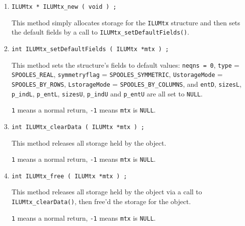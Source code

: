 \begin{enumerate}
\item
\begin{verbatim}
ILUMtx * ILUMtx_new ( void ) ;
\end{verbatim}
This method simply allocates storage for the {\tt ILUMtx} structure 
and then sets the default fields by a call to 
{\tt ILUMtx\_setDefaultFields()}.
\item
\begin{verbatim}
int ILUMtx_setDefaultFields ( ILUMtx *mtx ) ;
\end{verbatim}
This method sets the structure's fields to default values:
{\tt neqns = 0},
{\tt type} = {\tt SPOOLES\_REAL}, 
{\tt symmetryflag} = {\tt SPOOLES\_SYMMETRIC}, 
{\tt UstorageMode} = {\tt SPOOLES\_BY\_ROWS}, 
{\tt LstorageMode} = {\tt SPOOLES\_BY\_COLUMNS}, 
and {\tt entD}, {\tt sizesL}, {\tt p\_indL}, {\tt p\_entL},
{\tt sizesU}, {\tt p\_indU} and {\tt p\_entU} are all set to {\tt NULL}.
\par {}
{\tt 1} means a normal return,
{\tt -1} means {\tt mtx} is {\tt NULL}.
\item
\begin{verbatim}
int ILUMtx_clearData ( ILUMtx *mtx ) ;
\end{verbatim}
This method releases all storage held by the object.
\par {}
{\tt 1} means a normal return,
{\tt -1} means {\tt mtx} is {\tt NULL}.
\item
\begin{verbatim}
int ILUMtx_free ( ILUMtx *mtx ) ;
\end{verbatim}
This method releases all storage held by the object via a call to
{\tt ILUMtx\_clearData()}, then free'd the storage for the
object.
\par {}
{\tt 1} means a normal return,
{\tt -1} means {\tt mtx} is {\tt NULL}.
\end{enumerate}
\par
